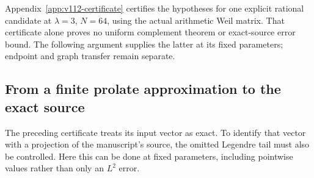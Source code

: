 \documentclass[11pt]{article}
\theoremstyle{remark}
\begin{document}
Appendix~\ref{app:v112-certificate} certifies the hypotheses for one
explicit rational candidate at $\lambda=3$, $N=64$, using the actual
arithmetic Weil matrix. That certificate alone proves no uniform complement theorem or
exact-source error bound. The following argument supplies the latter
at its fixed parameters; endpoint and graph transfer remain separate.


\subsection*{From a finite prolate approximation to the exact source}
The preceding certificate treats its input vector as exact. To identify
that vector with a projection of the manuscript's source, the omitted
Legendre tail must also be controlled. Here this can be done at fixed
parameters, including pointwise values rather than only an $L^2$ error.
\end{document}
